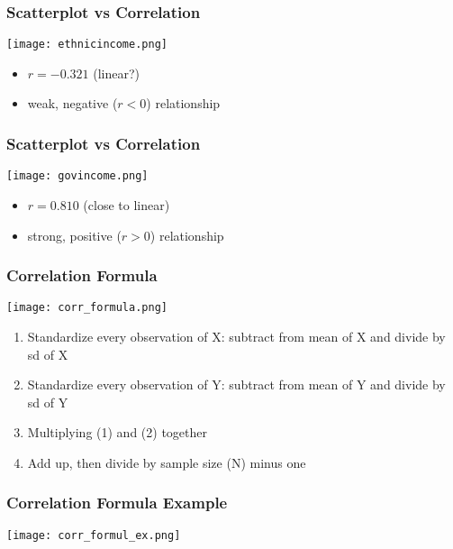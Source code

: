 \documentclass{beamer}
\begin{document}
\begin{frame}
 \frametitle<+->{Scatterplot vs Correlation}
 \begin{minipage}{.58\linewidth}
 \texttt{[image: ethnicincome.png]}
 \end{minipage}\hfill
 \begin{minipage}{.38\linewidth}
 \begin{itemize}
   \item $r = -0.321$ (linear?)
   \item weak, negative ($r < 0$) relationship 
 \end{itemize}
 \end{minipage}
\end{frame}

\begin{frame}
 \frametitle<+->{Scatterplot vs Correlation}
 \begin{minipage}{.58\linewidth}
 \texttt{[image: govincome.png]}
 \end{minipage}\hfill
 \begin{minipage}{.38\linewidth}
 \begin{itemize}
   \item $r = 0.810$ (close to linear)
   \item strong, positive ($r > 0$) relationship 
 \end{itemize}
 \end{minipage}
\end{frame}

\begin{frame}
 \frametitle{Correlation Formula}
 \begin{center}
 \texttt{[image: corr\_formula.png]}
 \end{center}
 \pause
 \begin{enumerate}[<+->]
   \item Standardize every observation of X: subtract from mean of X and divide by sd of X
   \item Standardize every observation of Y: subtract from mean of Y and divide by sd of Y
   \item Multiplying (1) and (2) together
   \item Add up, then divide by sample size (N) minus one
 \end{enumerate}
\end{frame}

\begin{frame}
 \frametitle<+->{Correlation Formula Example}
 \begin{center}
 \texttt{[image: corr\_formul\_ex.png]}
 \end{center}
\end{frame}
\end{document}
